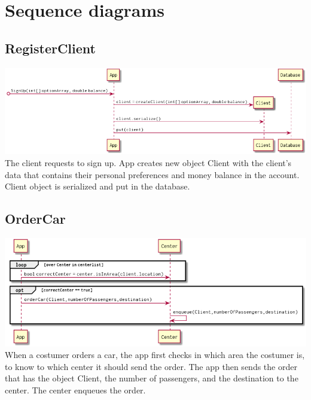 \documentclass[a4paper]{article}
\begin{document}
\section*{Sequence diagrams}
\subsection*{RegisterClient}
\includegraphics[width=1\textwidth]{../Diagrams/registerClient.png}\\
The client requests to sign up. App creates new object Client with the client's data that contains their personal preferences and money balance in the account. Client object is serialized and put in the database.

\subsection*{OrderCar}
\includegraphics[width=1\textwidth]{../Diagrams/orderCar.png}\\
When a costumer orders a car, the app first checks in which area the costumer is, to know to which center it should send the order. The app then sends the order that has the object Client, the number of passengers, and the destination to the center. The center enqueues the order.
\end{document}
